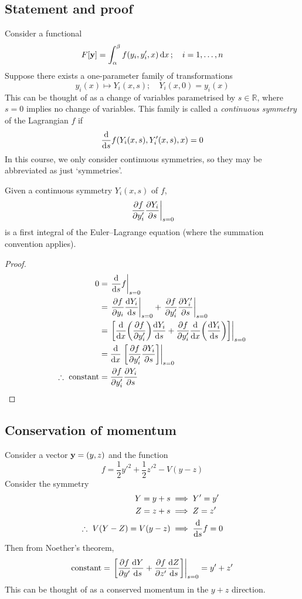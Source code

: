 \subsection{Statement and proof}
Consider a functional
\[
	F[\vb y] = \int_\alpha^\beta f(y_i, y_i', x) \dd{x};\quad i = 1,\dots,n
\]
Suppose there exists a one-parameter family of transformations
\[
	y_i(x) \mapsto Y_i(x,s);\quad Y_i(x,0) = y_i(x)
\]
This can be thought of as a change of variables parametrised by \( s \in \mathbb R \), where \( s = 0 \) implies no change of variables.
This family is called a \textit{continuous symmetry} of the Lagrangian \( f \) if
\[
	\dv{s} f(Y_i(x,s), Y_i'(x,s), x) = 0
\]
In this course, we only consider continuous symmetries, so they may be abbreviated as just `symmetries'.
\begin{theorem}
	Given a continuous symmetry \( Y_i(x,s) \) of \( f \),
	\[
		\eval{\pdv{f}{y_i'}\pdv{Y_i}{s}}_{s=0}
	\]
	is a first integral of the Euler--Lagrange equation (where the summation convention applies).
\end{theorem}
\begin{proof}
	\begin{align*}
		0                          & = \eval{\dv{s} f}_{s=0}                                                                           \\
		                           & = \eval{\pdv{f}{y_i} \dv{Y_i}{s}}_{s=0} + \eval{\pdv{f}{y_i'}\pdv{Y_i'}{s}}_{s=0}                 \\
		                           & = \eval{\qty[\dv{x} \qty(\pdv{f}{y_i'})\dv{Y_i}{s} + \pdv{f}{y_i'}\dv{x}\qty(\dv{Y_i}{s})]}_{s=0} \\
		                           & = \dv{x}\eval{\qty[\pdv{f}{y_i'}\pdv{Y_i}{s}]}_{s=0}                                              \\
		\therefore\ \text{constant} & = \pdv{f}{y_i'}\pdv{Y_i}{s}
	\end{align*}
\end{proof}

\subsection{Conservation of momentum}
\begin{example}
	Consider a vector \( \vb y = (y,z) \) and the function
	\[
		f = \frac{1}{2}y'^2 + \frac{1}{2}z'^2 - V(y-z)
	\]
	Consider the symmetry
	\begin{align*}
		Y = y + s                  & \implies Y' = y'      \\
		Z = z + s                  & \implies Z = z'       \\
		\therefore\ V(Y-Z) = V(y-z) & \implies \dv{s} f = 0
	\end{align*}
	Then from Noether's theorem,
	\[
		\text{constant} = \eval{\qty[\pdv{f}{y'}\dv{Y}{s} + \pdv{f}{z'}\dv{Z}{s}]}_{s=0} = y' + z'
	\]
	This can be thought of as a conserved momentum in the \(y+z\) direction.
\end{example}


